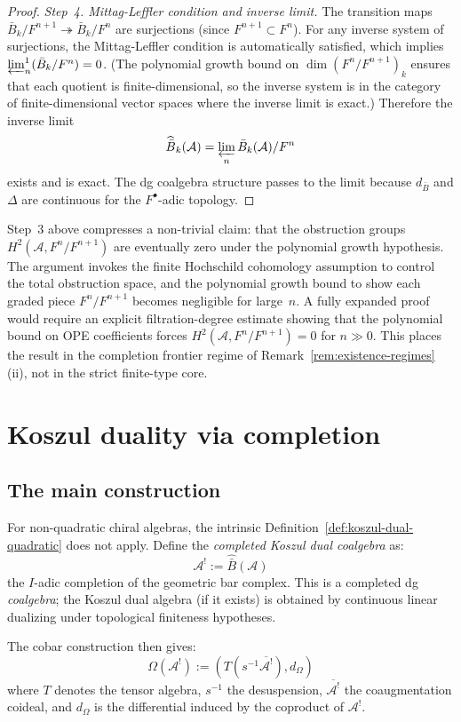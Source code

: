 \begin{proof}
\emph{Step~4. Mittag-Leffler condition and inverse limit.}
The transition maps $\bar{B}_k/F^{n+1} \twoheadrightarrow \bar{B}_k/F^n$ are surjections (since $F^{n+1} \subset F^n$).  For any inverse system of surjections, the Mittag-Leffler condition is automatically satisfied, which implies $\varprojlim^1_n (\bar{B}_k/F^n) = 0$.  (The polynomial growth bound on $\dim(F^n/F^{n+1})_k$ ensures that each quotient is finite-dimensional, so the inverse system is in the category of finite-dimensional vector spaces where the inverse limit is exact.)  Therefore the inverse limit
\[
\widehat{\bar{B}}_k(\mathcal{A}) = \varprojlim_n \bar{B}_k(\mathcal{A})/F^n
\]
exists and is exact.  The dg coalgebra structure passes to the limit because $d_{\bar{B}}$ and $\Delta$ are continuous for the $F^\bullet$-adic topology.
\end{proof}

\begin{remark}\label{rem:completion-convergence-frontier}
Step~3 above compresses a non-trivial claim: that the obstruction
groups $H^2(\mathcal{A}, F^n/F^{n+1})$ are eventually zero under the
polynomial growth hypothesis.  The argument invokes the finite
Hochschild cohomology assumption to control the total obstruction space,
and the polynomial growth bound to show each graded piece $F^n/F^{n+1}$
becomes negligible for large~$n$.  A fully expanded proof would require
an explicit filtration-degree estimate showing that the polynomial bound
on OPE coefficients forces $H^2(\mathcal{A}, F^n/F^{n+1}) = 0$ for
$n \gg 0$.  This places the result in the completion frontier regime of
Remark~\ref{rem:existence-regimes}(ii), not in the strict finite-type
core.
\end{remark}

\section{Koszul duality via completion}

\subsection{The main construction}

\begin{construction}\label{const:completed-koszul}
For non-quadratic chiral algebras, the intrinsic
Definition~\ref{def:koszul-dual-quadratic} does not apply.
Define the \emph{completed Koszul dual coalgebra} as:
\[\mathcal{A}^! := \widehat{\bar{B}}(\mathcal{A})\]
the $I$-adic completion of the geometric bar complex.
This is a completed dg \emph{coalgebra}; the Koszul dual algebra
(if it exists) is obtained by continuous linear dualizing under
topological finiteness hypotheses.

The cobar construction then gives:
\[\Omega(\mathcal{A}^!) := (T(s^{-1}\overline{\mathcal{A}^!}), d_\Omega)\]
where $T$ denotes the tensor algebra, $s^{-1}$ the desuspension, $\overline{\mathcal{A}^!}$ the coaugmentation coideal, and $d_\Omega$ is the differential induced by the coproduct of $\mathcal{A}^!$.
\end{construction}

